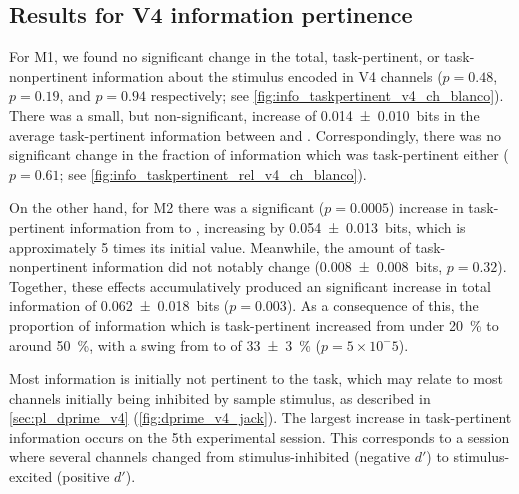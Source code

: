 \subsection{Results for \acs{V4} information pertinence}

For \ac{M1}, we found no significant change in the total, task-pertinent, or task-nonpertinent information about the stimulus encoded in \ac{V4} channels ($p=0.48$, $p=0.19$, and $p=0.94$ respectively; see \autoref{fig:info_taskpertinent_v4_ch_blanco}).
There was a small, but non-significant, increase of \SI{+0.014\pm0.010}{bits} in the average task-pertinent information between  and .
Correspondingly, there was no significant change in the fraction of information which was task-pertinent either ($p=0.61$; see \autoref{fig:info_taskpertinent_rel_v4_ch_blanco}).

On the other hand, for \ac{M2} there was a significant ($p=0.0005$) increase in task-pertinent information from  to , increasing by \SI{+0.054\pm0.013}{bits}, which is approximately \num{5} times its initial value.
Meanwhile, the amount of task-nonpertinent information did not notably change (\SI{+0.008\pm0.008}{bits}, $p=0.32$).
Together, these effects accumulatively produced an significant increase in total information of \SI{+0.062\pm0.018}{bits} ($p=0.003$).
As a consequence of this, the proportion of information which is task-pertinent increased from under \SI{20}{\percent} to around \SI{50}{\percent}, with a swing from  to  of \SI{+33\pm3}{\percent} ($p=5 \times 10^-5$).

Most information is initially not pertinent to the task, which may relate to most channels initially being inhibited by sample stimulus, as described in \autoref{sec:pl_dprime_v4} (\autoref{fig:dprime_v4_jack}).
The largest increase in task-pertinent information occurs on the 5th experimental session.
This corresponds to a session where several channels changed from stimulus-inhibited (negative $d'$) to stimulus-excited (positive $d'$).

